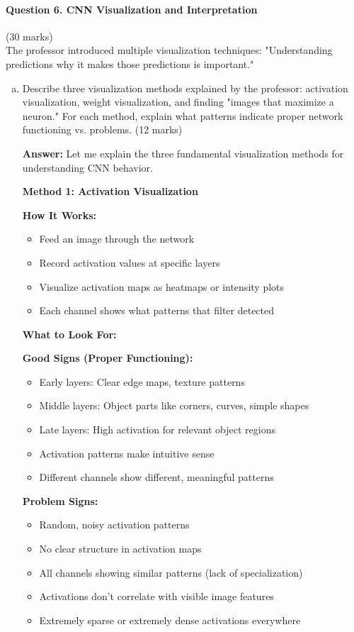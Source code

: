 \documentclass[12pt]{article}
\newcommand{\answer}[1]{{\color{answercolor}\textbf{Answer:} #1}}
\newcommand{\explanation}[1]{{\color{explanationcolor}#1}}
\begin{document}
\newpage
\paragraph{Question 6. CNN Visualization and Interpretation}{\hfill (30 marks)}\\
The professor introduced multiple visualization techniques: "Understanding predictions why it makes those predictions is important."

\begin{enumerate}[(a)]
    \item Describe three visualization methods explained by the professor: activation visualization, weight visualization, and finding "images that maximize a neuron." For each method, explain what patterns indicate proper network functioning vs. problems. \hfill (12 marks)
    
    \answer{
    Let me explain the three fundamental visualization methods for understanding CNN behavior.
    
    \textbf{Method 1: Activation Visualization}
    
    \explanation{
    \textbf{How It Works:}
    \begin{itemize}
        \item Feed an image through the network
        \item Record activation values at specific layers
        \item Visualize activation maps as heatmaps or intensity plots
        \item Each channel shows what patterns that filter detected
    \end{itemize}
    
    \textbf{What to Look For:}
    
    \textbf{Good Signs (Proper Functioning):}
    \begin{itemize}
        \item Early layers: Clear edge maps, texture patterns
        \item Middle layers: Object parts like corners, curves, simple shapes
        \item Late layers: High activation for relevant object regions
        \item Activation patterns make intuitive sense
        \item Different channels show different, meaningful patterns
    \end{itemize}
    
    \textbf{Problem Signs:}
    \begin{itemize}
        \item Random, noisy activation patterns
        \item No clear structure in activation maps
        \item All channels showing similar patterns (lack of specialization)
        \item Activations don't correlate with visible image features
        \item Extremely sparse or extremely dense activations everywhere
    \end{itemize}
    
}}
\end{enumerate}
\end{document}
